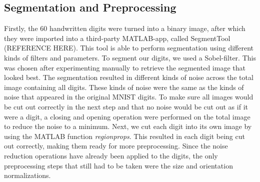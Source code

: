 \documentclass[11pt,twoside,a4paper]{article}
\begin{document}
\subsection{Segmentation and Preprocessing}
Firstly, the 60 handwritten digits were turned into a binary image, after which they were imported into a third-party MATLAB-app, called SegmentTool (REFERENCE HERE). This tool is able to perform segmentation using different kinds of filters and parameters. To segment our digits, we used a Sobel-filter. This was chosen after experimenting manually to retrieve the segmented image that looked best.\newline
\newline
The segmentation resulted in different kinds of noise across the total image containing all digits. These kinds of noise were the same as the kinds of noise that appeared in the original MNIST digits. To make sure all images would be cut out correctly in the next step and that no noise would be cut out as if it were a digit, a closing and opening operation were performed on the total image to reduce the noise to a minimum. Next, we cut each digit into its own image by using the MATLAB function \emph{regionprops}. This resulted in each digit being cut out correctly, making them ready for more preprocessing. Since the noise reduction operations have already been applied to the digits, the only preprocessing steps that still had to be taken were the size and orientation normalizations.

\end{document}
